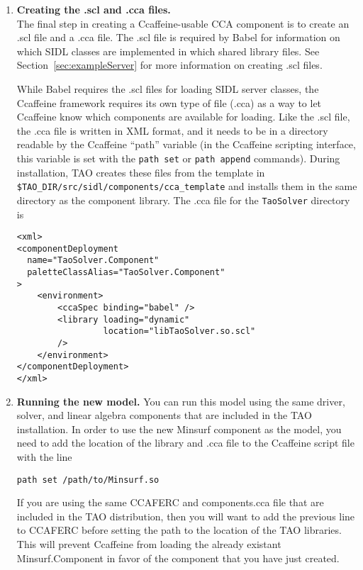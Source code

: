 \documentclass[doublespacing,12pt]{article}
\begin{document}
\begin{enumerate}
\item \textbf{Creating the .scl and .cca files.}\\
The final step in creating a Ccaffeine-usable CCA component is to
create an .scl file and a .cca file.  The .scl file is required by
Babel for information on which SIDL classes are implemented in which
shared library files.  See Section~\ref{sec:exampleServer} for more
information on creating .scl files.

While Babel requires the .scl files for loading SIDL server classes,
the Ccaffeine framework requires its own type of 
file (.cca) as a way to let Ccaffeine know which 
components are available for loading.
Like the .scl file, the .cca file is written in XML format, and it needs
to be in a directory
readable by the Ccaffeine ``path'' variable (in the Ccaffeine scripting
interface, this variable is set with the \texttt{path set} or
\texttt{path append} commands).  During installation, TAO creates
these files from the template in 
\texttt{\$TAO\_DIR/src/sidl/components/cca\_template}
and installs them in the same directory as the component library.
The .cca file for the \texttt{TaoSolver} directory is 

\begin{verbatim}
<xml>
<componentDeployment
  name="TaoSolver.Component"
  paletteClassAlias="TaoSolver.Component"
>
    <environment>
        <ccaSpec binding="babel" />
        <library loading="dynamic"
                 location="libTaoSolver.so.scl"
        />
    </environment>
</componentDeployment>
</xml>
\end{verbatim}



\item \textbf{Running the new model.}
You can run this model using the same driver, solver, and linear
algebra components that are included in the TAO installation.  In
order to use the new Minsurf component as the model, you need to add
the location of the library and .cca file to the Ccaffeine script file
with the line

\noindent \texttt{path set /path/to/Minsurf.so}

If you are using the same CCAFERC and components.cca file that are
included in the TAO distribution, then you will want to add the
previous line to CCAFERC before setting the path to the location of
the TAO libraries.  This will prevent Ccaffeine from loading the
already existant \textsf{Minsurf.Component} in favor of the component that you
have just created.

\end{enumerate}
\end{document}
